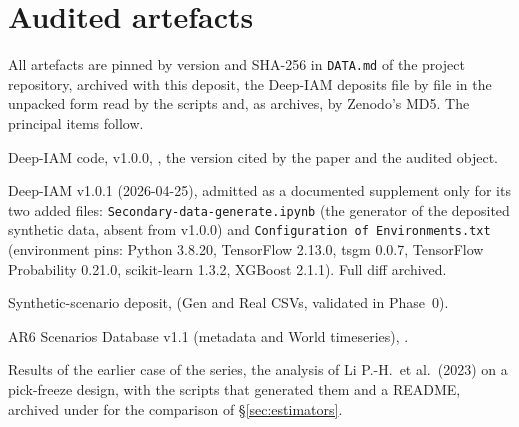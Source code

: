 \documentclass[11pt,a4paper]{article}
\newcommand{\prop}[1]{#1}
\newcommand{\prop}[1]{\textcolor{blue}{#1}}
\begin{document}
\section{Audited artefacts}\label{sec:artefacts}
All artefacts are pinned by version and SHA-256 in \texttt{DATA.md} of the
project repository, archived with this deposit, the Deep-IAM deposits
file by file in the unpacked form read by the scripts and, as archives, by
Zenodo's MD5. The principal items follow.
\begin{description}[nosep,font=\normalfont\bfseries,leftmargin=3.8em,labelwidth=3.4em,labelsep=0.4em,align=left]
\item[A1] Deep-IAM code, v1.0.0, , the
  version cited by the paper and the audited object.
\item[A2] Deep-IAM v1.0.1 (2026-04-25), admitted as a documented supplement
  only for its two added files: \texttt{Secondary-data-generate.ipynb} (the
  generator of the deposited synthetic data, absent from v1.0.0) and
  \texttt{Configuration of Environments.txt} (environment pins: Python
  3.8.20, TensorFlow 2.13.0, tsgm 0.0.7, TensorFlow Probability
  0.21.0, scikit-learn 1.3.2, XGBoost 2.1.1). Full diff archived.
\item[A3] Synthetic-scenario deposit, 
  (Gen and Real CSVs, validated in Phase~0).
\item[B1--B2] AR6 Scenarios Database v1.1 (metadata and World
  timeseries), .
\item[C1] Results of the earlier case of the series, the analysis of
  Li P.-H.\ et al.\ (2023) \prop{on a pick-freeze design}, with the scripts that
  generated them and a README, archived under 
  for the comparison of \S\ref{sec:estimators}.
\end{description}
\end{document}
